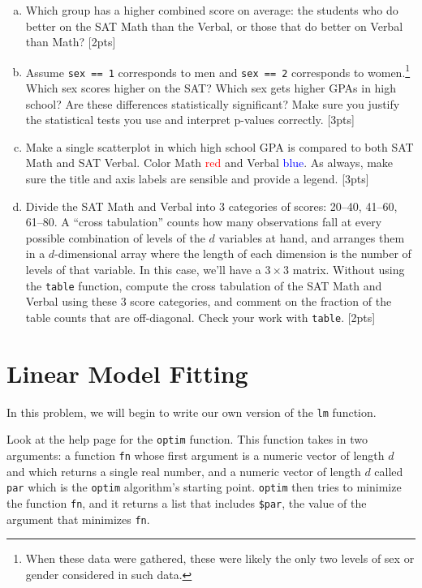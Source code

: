 \documentclass[12pt]{article}
\begin{document}
\begin{enumerate}[(a)]
	\item Which group has a higher combined score on average: the students who do better on the SAT Math than the Verbal, or those that do better on Verbal than Math? [2pts]
	\item Assume \verb|sex == 1| corresponds to men and \verb|sex == 2| corresponds to women.\footnote{When these data were gathered, these were likely the only two levels of sex or gender considered in such data.} Which sex scores higher on the SAT? Which sex gets higher GPAs in high school? Are these differences statistically significant? Make sure you justify the statistical tests you use and interpret p-values correctly. [3pts] 
	\item Make a single scatterplot in which high school GPA is compared to both SAT Math and SAT Verbal. Color Math \textcolor{red}{red} and Verbal \textcolor{blue}{blue}. As always, make sure the title and axis labels are sensible and provide a legend. [3pts]
	\item Divide the SAT Math and Verbal into 3 categories of scores: 20--40, 41--60, 61--80. A ``cross tabulation'' counts how many observations fall at every possible combination of levels of the $d$ variables at hand, and arranges them in a $d$-dimensional array where the length of each dimension is the number of levels of that variable. In this case, we'll have a $3 \times 3$ matrix. Without using the \verb|table| function, compute the cross tabulation of the SAT Math and Verbal using these 3 score categories, and comment on the fraction of the table counts that are off-diagonal. Check your work with \verb|table|. [2pts]
\end{enumerate}

\section{Linear Model Fitting}

In this problem, we will begin to write our own version of the \verb|lm| function.

Look at the help page for the \verb|optim| function. This function takes in two arguments: a function \verb|fn| whose first argument is a numeric vector of length $d$ and which returns a single real number, and a numeric vector of length $d$ called \verb|par| which is the \verb|optim| algorithm's starting point. \verb|optim| then tries to minimize the function \verb|fn|, and it returns a list that includes \verb|$par|, the value of the argument that minimizes \verb|fn|.
\end{document}
